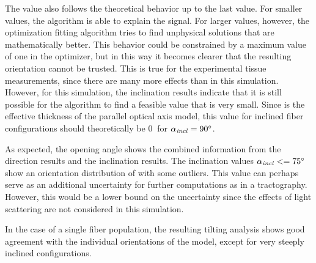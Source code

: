 \par
%
The \trel{} value also follows the theoretical behavior up to the last value.
For smaller \trel{} values, the algorithm is able to explain the signal.
For larger \trel{} values, however, the optimization fitting algorithm tries to find unphysical solutions that are mathematically better.
This behavior could be constrained by a maximum \trel{} value of one in the optimizer, but in this way it becomes clearer that the resulting orientation cannot be trusted.
This is true for the experimental tissue measurements, since there are many more effects than in this simulation.
However, for this simulation, the inclination results indicate that it is still possible for the algorithm to find a feasible \trel{} value that is very small.
Since \trel{} is the effective thickness of the parallel optical axis model, this value for inclined fiber configurations should theoretically be $\SI{0}{}$ for $\textnormal{$\alpha_{\mathit{incl}}$}=\SI{90}{\degree}$.
\par
%
As expected, the opening angle shows the combined information from the direction results and the inclination results.
The inclination values $\textnormal{$\alpha_{\mathit{incl}}$} <= \SI{75}{\degree}$ show an orientation distribution of \dummy{} with some outliers.
This value can perhaps serve as an additional uncertainty for further computations as in a tractography.
However, this would be a lower bound on the uncertainty since the effects of light scattering are not considered in this simulation.
\par
%
In the case of a single fiber population, the resulting tilting analysis shows good agreement with the individual orientations of the model, except for very steeply inclined configurations.
%
% 
% 
